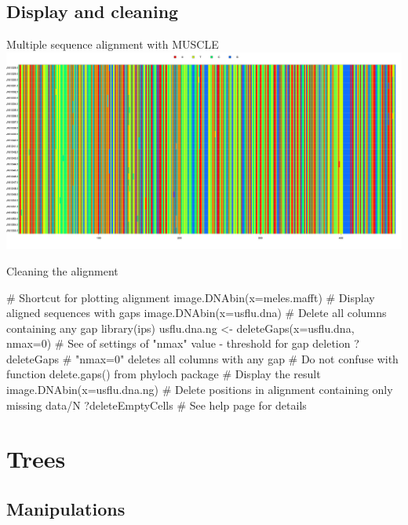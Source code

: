 \documentclass[compress, ucs, xelatex, 11pt, xcolor=svgnames,
  hyperref={
    bookmarks=true,
    unicode=true,
    colorlinks=true,
    pdftitle={Molecular data in R},
    plainpages=false,
    pdfauthor={Vojtech Zeisek},
    pdfsubject={Course about phylogeny and evolution in R},
    pdfcreator={XeLaTeX},
    pdfkeywords={R, evolution, phylogeny, molecular data},
    linkcolor=Tomato,
    anchorcolor=SaddleBrown,
    citecolor=Goldenrod,
    filecolor=DarkMagenta,
    menucolor=Sienna,
    urlcolor=DarkTurquoise,
    pdftex},
  url={hyphens, lowtilde} %
  ]{beamer}
\begin{document}
\subsection{Display and cleaning}

\begin{frame}{Multiple sequence alignment with MUSCLE}
\includegraphics[width=\textwidth]{muscle.png}
\end{frame}

\begin{frame}[fragile]{Cleaning the alignment}
  \begin{spluscode}
    # Shortcut for plotting alignment
    image.DNAbin(x=meles.mafft)
    # Display aligned sequences with gaps
    image.DNAbin(x=usflu.dna)
    # Delete all columns containing any gap
    library(ips)
    usflu.dna.ng <- deleteGaps(x=usflu.dna, nmax=0)
    # See of settings of "nmax" value - threshold for gap deletion
    ?deleteGaps # "nmax=0" deletes all columns with any gap
    # Do not confuse with function delete.gaps() from phyloch package
    # Display the result
    image.DNAbin(x=usflu.dna.ng)
    # Delete positions in alignment containing only missing data/N
    ?deleteEmptyCells # See help page for details
  \end{spluscode}
\end{frame}

\section{Trees}

\subsection{Manipulations}
\end{document}
